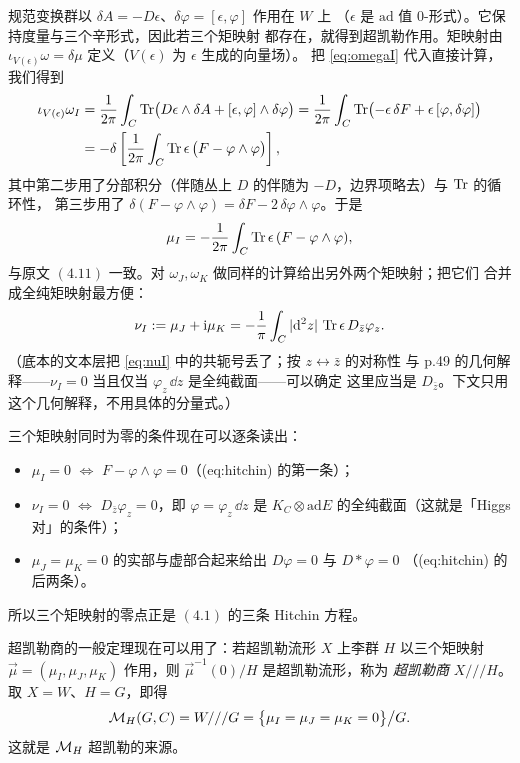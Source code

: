 规范变换群以 $\delta A=-D\epsilon$、$\delta\varphi=[\epsilon,\varphi]$ 作用在 $W$ 上
（$\epsilon$ 是 $\mathrm{ad}$ 值 $0$-形式）。它保持度量与三个辛形式，因此若三个矩映射
都存在，就得到超凯勒作用。矩映射由
$\iota_{V(\epsilon)}\omega=\delta\mu$ 定义（$V(\epsilon)$ 为 $\epsilon$ 生成的向量场）。
把 \eqref{eq:omegaI} 代入直接计算，我们得到\pB{}
\begin{align}
\iota_{V(\epsilon)}\omega_I
&=\frac{1}{2\pi}\int_C\operatorname{Tr}\bigl(D\epsilon\wedge\delta A+[\epsilon,\varphi]\wedge\delta\varphi\bigr)
=\frac{1}{2\pi}\int_C\operatorname{Tr}\bigl(-\epsilon\,\delta F+\epsilon\,[\varphi,\delta\varphi]\bigr)\notag\\
&=-\delta\left[\frac{1}{2\pi}\int_C\operatorname{Tr}\epsilon\,\bigl(F-\varphi\wedge\varphi\bigr)\right],
\label{eq:muI-derivation}
\end{align}
其中第二步用了分部积分（伴随丛上 $D$ 的伴随为 $-D$，边界项略去）与 $\operatorname{Tr}$ 的循环性，
第三步用了 $\delta(F-\varphi\wedge\varphi)=\delta F-2\,\delta\varphi\wedge\varphi$。于是
\begin{equation}
\mu_I=-\frac{1}{2\pi}\int_C\operatorname{Tr}\epsilon\,(F-\varphi\wedge\varphi),
\label{eq:muI}
\end{equation}
与原文 $(4.11)$ 一致。对 $\omega_J,\omega_K$ 做同样的计算给出另外两个矩映射；把它们
合并成全纯矩映射最方便：\pB{}
\begin{equation}
\nu_I:=\mu_J+\mathrm{i}\mu_K=-\frac{1}{\pi}\int_C|\mathrm{d}^2z|\,\operatorname{Tr}\epsilon\,D_{\bar z}\varphi_z .
\label{eq:nuI}
\end{equation}
（底本的文本层把 \eqref{eq:nuI} 中的共轭号丢了；按 $z\leftrightarrow\bar z$ 的对称性
与 p.49 的几何解释——$\nu_I=0$ 当且仅当 $\varphi_z\,\dd z$ 是全纯截面——可以确定
这里应当是 $D_{\bar z}$。下文只用这个几何解释，不用具体的分量式。）

三个矩映射同时为零的条件现在可以逐条读出：
\begin{itemize}
\item $\mu_I=0$ $\iff$ $F-\varphi\wedge\varphi=0$（(eq:hitchin) 的第一条）；
\item $\nu_I=0$ $\iff$ $D_{\bar z}\varphi_z=0$，即 $\varphi=\varphi_z\,\dd z$ 是
  $K_C\otimes\mathrm{ad}E$ 的全纯截面（这就是「Higgs 对」的条件）；
\item $\mu_J=\mu_K=0$ 的实部与虚部合起来给出 $D\varphi=0$ 与 $D{*}\varphi=0$
  （(eq:hitchin) 的后两条）。
\end{itemize}
所以三个矩映射的零点正是 $(4.1)$ 的三条 Hitchin 方程。\pB{}

超凯勒商的一般定理现在可以用了：若超凯勒流形 $X$ 上李群 $H$ 以三个矩映射
$\vec\mu=(\mu_I,\mu_J,\mu_K)$ 作用，则 $\vec\mu^{-1}(0)/H$ 是超凯勒流形，称为
\emph{超凯勒商} $X///H$。取 $X=W$、$H=G$，即得
\begin{equation}
\mathcal{M}_H(G,C)=W///G=\bigl\{\mu_I=\mu_J=\mu_K=0\bigr\}\big/G .
\label{eq:HKquotient}
\end{equation}
这就是 $\mathcal{M}_H$ 超凯勒的来源。\pA{}

